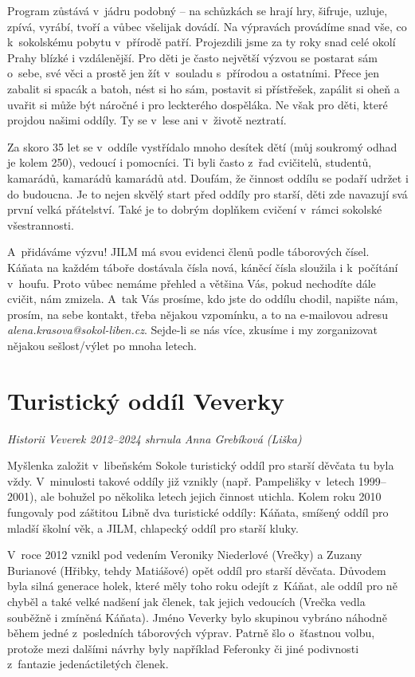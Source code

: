 \documentclass[a5paper, 11pt, twoside]{article}
\begin{document}
Program zůstává v~jádru podobný -- na schůzkách se hrají hry, šifruje,
uzluje, zpívá, vyrábí, tvoří a vůbec všelijak dovádí. Na výpravách
provádíme snad vše, co k~sokolskému pobytu v~přírodě patří. Projezdili
jsme za ty roky snad celé okolí Prahy blízké i vzdálenější. Pro děti je
často největší výzvou se postarat sám o~sebe, své věci a prostě jen žít
v~souladu s~přírodou a ostatními. Přece jen zabalit si spacák a batoh,
nést si ho sám, postavit si přístřešek, zapálit si oheň a uvařit si může
být náročné i pro leckterého dospěláka. Ne však pro děti, které projdou
našimi oddíly. Ty se v~lese ani v~životě neztratí.

Za skoro 35 let se v~oddíle vystřídalo mnoho desítek dětí (můj soukromý
odhad je kolem 250), vedoucí i pomocníci. Ti byli často z~řad cvičitelů,
studentů, kamarádů, kamarádů kamarádů atd. Doufám, že činnost oddílu se
podaří udržet i do budoucna. Je to nejen skvělý start před oddíly pro
starší, děti zde navazují svá první velká přátelství. Také je to dobrým
doplňkem cvičení v~rámci sokolské všestrannosti.

A~přidáváme výzvu! JILM má svou evidenci členů podle táborových
čísel. Káňata na každém táboře dostávala čísla nová, káněcí čísla
sloužila i k~počítání v~houfu. Proto vůbec nemáme přehled a většina Vás,
pokud nechodíte dále cvičit, nám zmizela. A~tak Vás prosíme, kdo jste do
oddílu chodil, napište nám, prosím, na sebe kontakt, třeba nějakou
vzpomínku, a to na e-mailovou adresu
\textit{alena.krasova@sokol-liben.cz}. Sejde-li se nás více, zkusíme
i my zorganizovat nějakou sešlost/výlet po mnoha letech.

\section{Turistický oddíl Veverky}

\begin{center}
  \textit{Historii Veverek 2012--2024 shrnula Anna Grebíková (Liška)}
\end{center}

\noindent
Myšlenka založit v~libeňském Sokole turistický oddíl pro starší děvčata
tu byla vždy. V~minulosti takové oddíly již vznikly (např. Pampelišky
v~letech 1999--2001), ale bohužel po několika letech jejich činnost
utichla. Kolem roku 2010 fungovaly pod záštitou Libně dva turistické
oddíly: Káňata, smíšený oddíl pro mladší školní věk, a JILM, chlapecký
oddíl pro starší kluky.

V~roce 2012 vznikl pod vedením Veroniky Niederlové (Vrečky) a Zuzany
Burianové (Hřibky, tehdy Matiášové) opět oddíl pro starší děvčata.
Důvodem byla silná generace holek, které měly toho roku odejít z~Káňat,
ale oddíl pro ně chyběl a také velké nadšení jak členek, tak jejich
vedoucích (Vrečka vedla souběžně i zmíněná Káňata). Jméno Veverky bylo
skupinou vybráno náhodně během jedné z~posledních táborových výprav.
Patrně šlo o~šťastnou volbu, protože mezi dalšími návrhy byly například
Feferonky či jiné podivnosti z~fantazie jedenáctiletých členek.
\end{document}
